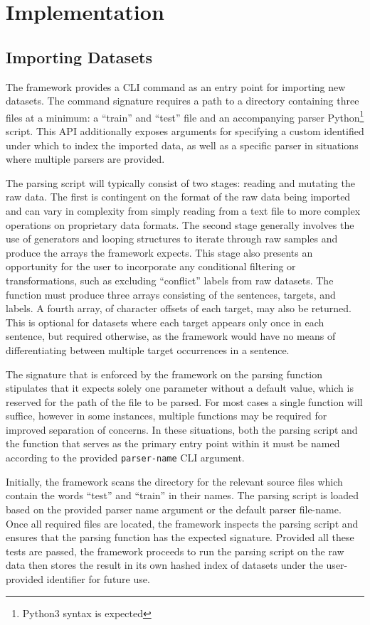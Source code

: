 \documentclass[12pt, a4paper]{report}
\theoremstyle{definition}
\theoremstyle{definition}%
\theoremstyle{definition}%
\theoremstyle{definition}%
\theoremstyle{definition}%
\theoremstyle{definition}%
\begin{document}
\chapter{Implementation}
\section{Importing Datasets} \label{sec:importing_datasets}
The framework provides a CLI command as an entry point for importing new datasets. The command signature requires a path to a directory containing three files at a minimum: a \enquote{train} and \enquote{test} file and an accompanying parser Python\footnote{Python3 syntax is expected} script. This API additionally exposes arguments for specifying a custom identified under which to index the imported data, as well as a specific parser in situations where multiple parsers are provided.

The parsing script will typically consist of two stages: reading and mutating the raw data. The first is contingent on the format of the raw data being imported and can vary in complexity from simply reading from a text file to more complex operations on proprietary data formats. The second stage generally involves the use of generators and looping structures to iterate through raw samples and produce the arrays the framework expects. This stage also presents an opportunity for the user to incorporate any conditional filtering or transformations, such as excluding \enquote{conflict} labels from raw datasets. The function must produce three arrays consisting of the sentences, targets, and labels. A fourth array, of character offsets of each target, may also be returned. This is optional for datasets where each target appears only once in each sentence, but required otherwise, as the framework would have no means of differentiating between multiple target occurrences in a sentence.

The signature that is enforced by the framework on the parsing function stipulates that it expects solely one parameter without a default value, which is reserved for the path of the file to be parsed. For most cases a single function will suffice, however in some instances, multiple functions may be required for improved  separation of concerns. In these situations, both the parsing script and the function that serves as the primary entry point within it must be named according to the provided \texttt{parser-name} CLI argument. 

Initially, the framework scans the directory for the relevant source files which contain the words \enquote{test} and \enquote{train} in their names. The parsing script is loaded based on the provided parser name argument or the default parser file-name. Once all required files are located, the framework inspects the parsing script and ensures that the parsing function has the expected signature. Provided all these tests are passed, the framework proceeds to run the parsing script on the raw data then stores the result in its own hashed index of datasets under the user-provided identifier for future use.
\end{document}

